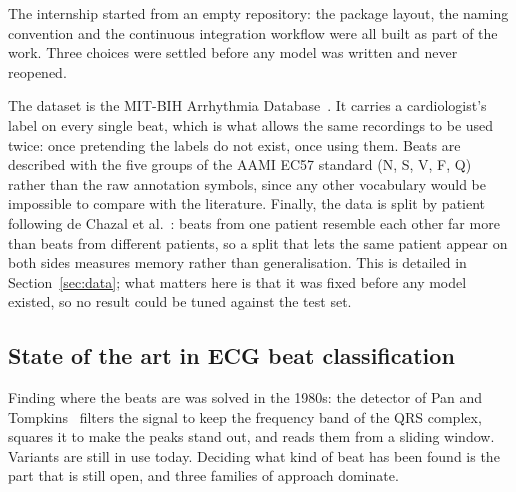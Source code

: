 \documentclass[a4paper, 12pt]{article}
\begin{document}
The internship started from an empty repository: the package layout, the
naming convention and the continuous integration workflow were all built as
part of the work. Three choices were settled before any model was
written and never reopened.

The dataset is the MIT-BIH Arrhythmia Database~\cite{moody2001mitbih}. It
carries a cardiologist's label on every single beat, which is what allows
the same recordings to be used twice: once pretending the labels do not
exist, once using them. Beats are described with the five groups of the
AAMI EC57 standard (N, S, V, F, Q)~\cite{aami2012ec57} rather than the raw
annotation symbols, since any other vocabulary would be impossible to
compare with the literature. Finally, the data is split by patient
following de Chazal et al.~\cite{dechazal2004}: beats from one patient
resemble each other far more than beats from different patients, so a split
that lets the same patient appear on both sides measures memory rather than
generalisation. This is detailed in Section~\ref{sec:data}; what matters
here is that it was fixed before any model existed, so no result could be
tuned against the test set.



\subsection{State of the art in ECG beat classification}\label{subsec:sota}

Finding where the beats are was solved in the 1980s: the detector of
Pan and Tompkins~\cite{pan1985qrs} filters the signal to keep the frequency
band of the QRS complex, squares it to make the peaks stand out, and reads
them from a sliding window. Variants are still in use today. Deciding what
kind of beat has been found is the part that is still open, and three
families of approach dominate.
\end{document}
